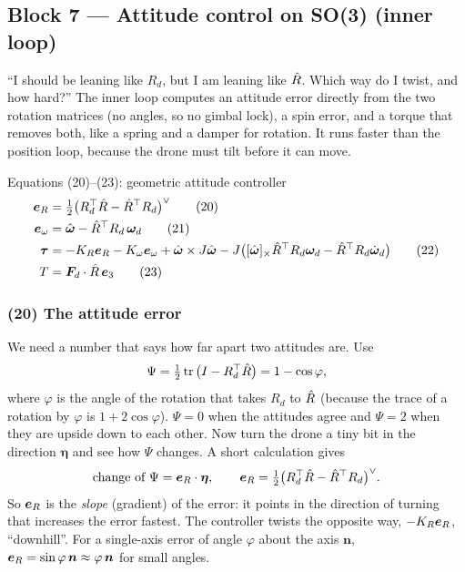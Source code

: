 \subsection{Block 7 --- Attitude control on SO(3) (inner loop)}
\label{sec:m1b7}

\begin{idea}
``I should be leaning like $R_d$, but I am leaning like $\hat{R}$. Which way do I twist, and how hard?'' The inner loop
computes an attitude error directly from the two rotation matrices (no angles, so no gimbal lock), a spin error, and
a torque that removes both, like a spring and a damper for rotation. It runs faster than the position loop, because
the drone must tilt before it can move.
\end{idea}

\begin{eqbox}{Equations (20)--(23): geometric attitude controller}
\begin{align}
  \bm{e}_R &= \tfrac12\big(R_d^\top\hat{R}-\hat{R}^\top R_d\big)^\vee \tag{20}\label{eq:20}\\
  \bm{e}_\omega &= \hat{\bm\omega}-\hat{R}^\top R_d\,\bm{\omega}_d \tag{21}\label{eq:21}\\
  \bm{\tau} &= -K_R\bm{e}_R-K_\omega\bm{e}_\omega+\hat{\bm\omega}\times J\hat{\bm\omega}
          -J\big([\hat{\bm\omega}]_{\times}\hat{R}^\top R_d\bm{\omega}_d-\hat{R}^\top R_d\dot{\bm{\omega}}_d\big) \tag{22}\label{eq:22}\\
  T &= \bm{F}_d\cdot\hat{R}\,\bm{e}_3 \tag{23}\label{eq:23}
\end{align}
\end{eqbox}

\subsubsection*{(20) The attitude error}
We need a number that says how far apart two attitudes are. Use
\[
\Psi=\tfrac12\operatorname{tr}\big(I-R_d^\top\hat{R}\big)=1-\cos\varphi ,
\]
where $\varphi$ is the angle of the rotation that takes $R_d$ to $\hat{R}$ (because the trace of a rotation by $\varphi$ is
$1+2\cos\varphi$). $\Psi=0$ when the attitudes agree and $\Psi=2$ when they are upside down to each other.
Now turn the drone a tiny bit in the direction $\bm\eta$ and see how $\Psi$ changes. A short calculation gives
\[
\text{change of }\Psi=\bm{e}_R\cdot\bm\eta,\qquad \bm{e}_R=\tfrac12\big(R_d^\top\hat{R}-\hat{R}^\top R_d\big)^\vee .
\]
So $\bm{e}_R$ is the \emph{slope} (gradient) of the error: it points in the direction of turning that increases the
error fastest. The controller twists the opposite way, $-K_R\bm{e}_R$, ``downhill''. For a single-axis error of angle
$\varphi$ about the axis $\bm n$, $\bm{e}_R=\sin\varphi\,\bm n\approx\varphi\,\bm n$ for small angles.

